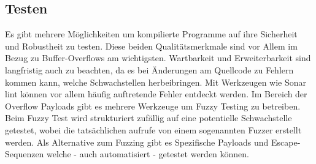 \subsection{Testen}
Es gibt mehrere Möglichkeiten um kompilierte Programme auf ihre Sicherheit
und Robustheit zu testen. Diese beiden Qualitätsmerkmale sind vor Allem
im Bezug zu Buffer-Overflows am wichtigsten. Wartbarkeit und Erweiterbarkeit
sind langfristig auch zu beachten, da es bei Änderungen am Quellcode
zu Fehlern kommen kann, welche Schwachstellen herbeibringen.
Mit Werkzeugen wie Sonar lint können vor allem häufig auftretende Fehler entdeckt
werden.
Im Bereich der Overflow Payloads gibt es mehrere Werkzeuge um Fuzzy Testing
zu betreiben. Beim Fuzzy Test wird strukturiert zufällig auf eine 
potentielle Schwachstelle getestet, wobei die tatsächlichen aufrufe
von einem sogenannten Fuzzer erstellt werden.
Als Alternative zum Fuzzing gibt es Spezifische Payloads und
Escape-Sequenzen welche - auch automatisiert - getestet werden können.


